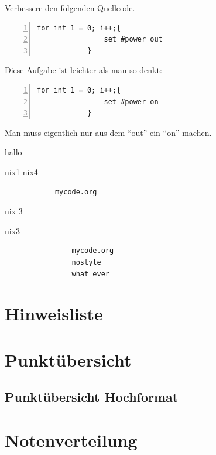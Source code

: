 \documentclass[a4paper,12pt]{scrartcl}
\begin{document}

    \begin{aufgabe}[points=5,subtitle=Aufgabe mit Quellcode und (Sub-)Titel]
        \setzeSymbol{\symHaken}
        Verbessere den folgenden Quellcode.
        \begin{lstlisting}[basicstyle={\ttfamily},numbers=left,gobble=10]
            for int 1 = 0; i++;{
                set #power out
            }
        \end{lstlisting}
    \end{aufgabe}
    \begin{loesung}
        Diese Aufgabe ist leichter als man so denkt:
        \begin{lstlisting}[basicstyle={\ttfamily},numbers=left,gobble=10]
            for int 1 = 0; i++;{
                set #power on
            }
        \end{lstlisting}
        Man muss eigentlich nur aus dem \enquote{out} ein \enquote{on} machen.
    \end{loesung}

    \begin{aufgabe*}[points=5, bonus-points=2,subtitle={Mein Titel}]
        hallo
        \begin{teilaufgaben}
            \teilaufgabe nix1
            \teilaufgabe nix4
        \end{teilaufgaben}

        \begin{lstlisting}
            mycode.org
        \end{lstlisting}

        \begin{loesung*}
            nix 3
            \begin{teilaufgaben}
                \teilaufgabe nix3
            \end{teilaufgaben}

            \begin{lstlisting}
                mycode.org
                nostyle
                what ever
            \end{lstlisting}
        \end{loesung*}
    \end{aufgabe*}

    \section*{Hinweisliste}
        \bearbeitungshinweisliste

    \section*{Punktübersicht}

        \punktuebersicht

    \subsection*{Punktübersicht Hochformat}
        \punktuebersicht[default]

    \section*{Notenverteilung}
        \notenverteilung
\end{document}
